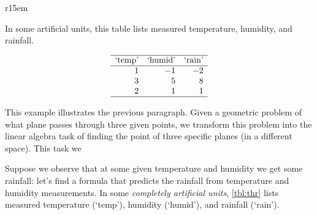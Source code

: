 \begin{wraptable}[9]r{15em}
\caption{In some artificial units, this table lists measured temperature, humidity, and rainfall.}
\label{tbl:thr}
\begin{equation*}
\begin{array}{rrr} \hline
\text{`temp'}&\text{`humid'}&\text{`rain'}\\\hline
1&-1&-2\\
3&5&8\\
2&1&1\\\hline
\end{array}
\end{equation*}
\end{wraptable}
\begin{example} \label{eg:inf3pts}
This example illustrates the previous paragraph.
Given a geometric problem of  what plane passes through three given points, we transform this problem into the linear algebra task of finding the  point of three specific planes (in a different space).
This task we 


Suppose we observe that at some given temperature and humidity we get some rainfall: let's find a formula that predicts the rainfall from temperature and humidity measurements.
In some \emph{completely artificial units}, \cref{tbl:thr} lists measured temperature (`temp'), humidity (`humid'), and rainfall (`rain').


\end{example}
